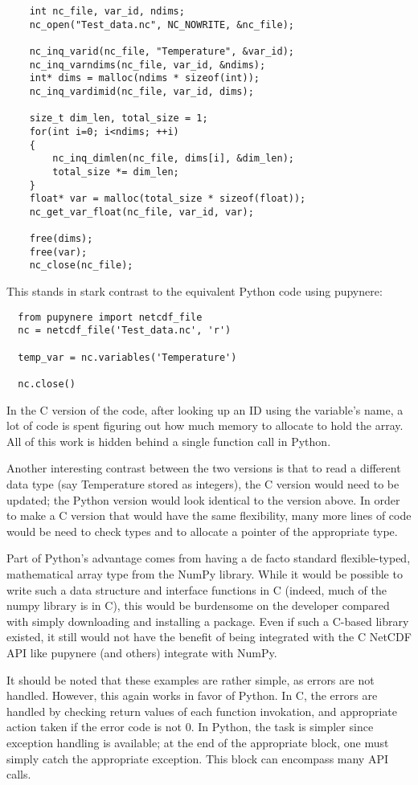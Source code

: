 \documentclass[twocolumn]{article}
\begin{document}
  \lstset{language=C}
  \begin{lstlisting}
    int nc_file, var_id, ndims;
    nc_open("Test_data.nc", NC_NOWRITE, &nc_file);

    nc_inq_varid(nc_file, "Temperature", &var_id);
    nc_inq_varndims(nc_file, var_id, &ndims);
    int* dims = malloc(ndims * sizeof(int));
    nc_inq_vardimid(nc_file, var_id, dims);

    size_t dim_len, total_size = 1;
    for(int i=0; i<ndims; ++i)
    {
        nc_inq_dimlen(nc_file, dims[i], &dim_len);
        total_size *= dim_len;
    }
    float* var = malloc(total_size * sizeof(float));
    nc_get_var_float(nc_file, var_id, var);
 
    free(dims);
    free(var);
    nc_close(nc_file);
  \end{lstlisting}
This stands in stark contrast to the equivalent Python code using pupynere:
  \lstset{language=Python}
  \begin{lstlisting}
  from pupynere import netcdf_file
  nc = netcdf_file('Test_data.nc', 'r')

  temp_var = nc.variables('Temperature')

  nc.close()
  \end{lstlisting}
In the C version of the code, after looking up an ID using the variable's name,
a lot of code is spent figuring out how much memory to allocate to hold the
array.  All of this work is hidden behind a single function call in Python.

Another interesting contrast between the two versions is that to read a different
data type (say Temperature stored as integers), the C version would need to be
updated; the Python version would look identical to the version above. In order
to make a C version that would have the same flexibility, many more lines of
code would be need to check types and to allocate a pointer of the appropriate
type.

Part of Python's advantage comes from having a de facto standard flexible-typed,
mathematical array type from the NumPy library. \citep{REFRENCE!} While it would
be possible to write such a data structure and interface functions in C (indeed,
much of the numpy library is in C), this would be burdensome on the developer
compared with simply downloading and installing a package. Even if such a C-based
library existed, it still would not have the benefit of being integrated with
the C NetCDF API like pupynere (and others) integrate with NumPy.

It should be noted that these examples are rather simple, as errors are not
handled. However, this again works in favor of Python. In C, the errors are
handled by checking return values of each function invokation, and appropriate
action taken if the error code is not 0. In Python, the task is simpler
since exception handling is available; at the end of the appropriate block, 
one must simply catch the appropriate exception. This block can encompass
many API calls.
\end{document}
